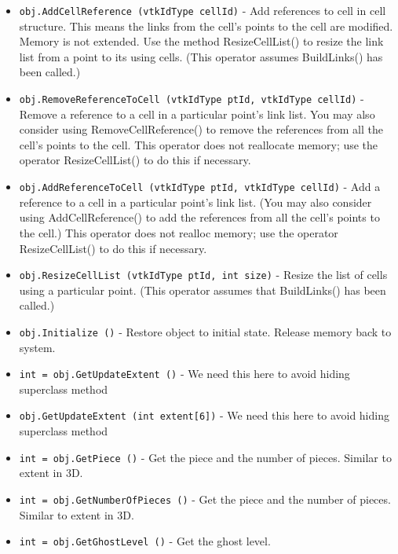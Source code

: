 \begin{itemize}
\item  \verb|obj.AddCellReference (vtkIdType cellId)| -  Add references to cell in cell structure. This means the links from
 the cell's points to the cell are modified. Memory is not extended. Use the
 method ResizeCellList() to resize the link list from a point to its using 
 cells. (This operator assumes BuildLinks() has been called.)

\item  \verb|obj.RemoveReferenceToCell (vtkIdType ptId, vtkIdType cellId)| -  Remove a reference to a cell in a particular point's link list. You may
 also consider using RemoveCellReference() to remove the references from
 all the cell's points to the cell. This operator does not reallocate
 memory; use the operator ResizeCellList() to do this if necessary.

\item  \verb|obj.AddReferenceToCell (vtkIdType ptId, vtkIdType cellId)| -  Add a reference to a cell in a particular point's link list. (You may also
 consider using AddCellReference() to add the references from all the 
 cell's points to the cell.) This operator does not realloc memory; use the
 operator ResizeCellList() to do this if necessary.

\item  \verb|obj.ResizeCellList (vtkIdType ptId, int size)| -  Resize the list of cells using a particular point. (This operator assumes
 that BuildLinks() has been called.)

\item  \verb|obj.Initialize ()| -  Restore object to initial state. Release memory back to system.

\item  \verb|int = obj.GetUpdateExtent ()| -  We need this here to avoid hiding superclass method

\item  \verb|obj.GetUpdateExtent (int extent[6])| -  We need this here to avoid hiding superclass method

\item  \verb|int = obj.GetPiece ()| -  Get the piece and the number of pieces. Similar to extent in 3D.

\item  \verb|int = obj.GetNumberOfPieces ()| -  Get the piece and the number of pieces. Similar to extent in 3D.

\item  \verb|int = obj.GetGhostLevel ()| -  Get the ghost level.


\end{itemize}
